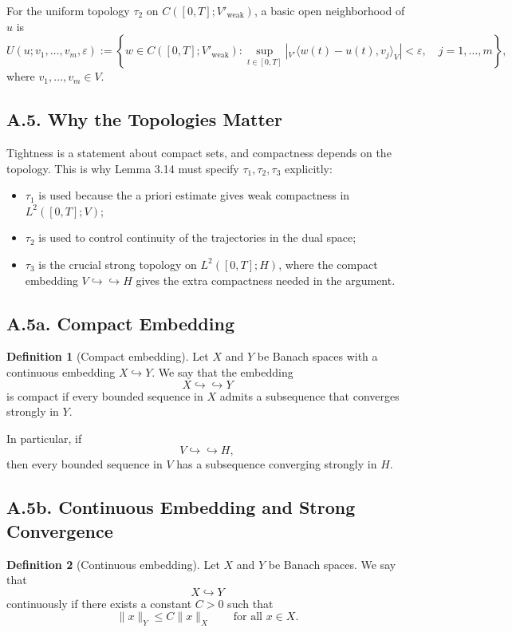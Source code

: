 \documentclass[11pt]{article}
\theoremstyle{definition}
\newtheorem{definition}{Definition}
\theoremstyle{remark}
\newcommand{\dual}[2]{{}_{V'}\langle #1, #2 \rangle_{V}}
\begin{document}
For the uniform topology $\tau_2$ on $C([0,T];V'_{\mathrm{weak}})$, a basic open neighborhood of $u$ is
\[
  U(u;v_1,\dots,v_m,\varepsilon)
  :=
  \left\{
    w\in C([0,T];V'_{\mathrm{weak}}):
    \sup_{t\in[0,T]}
    \left|
      \dual{w(t)-u(t)}{v_j}
    \right|<\varepsilon,\quad j=1,\dots,m
  \right\},
\]
where $v_1,\dots,v_m\in V$.

\subsection*{A.5. Why the Topologies Matter}
Tightness is a statement about compact sets, and compactness depends on the topology. This is why Lemma 3.14 must specify $\tau_1,\tau_2,\tau_3$ explicitly:
\begin{itemize}
\item $\tau_1$ is used because the a priori estimate gives weak compactness in $L^2([0,T];V)$;
\item $\tau_2$ is used to control continuity of the trajectories in the dual space;
\item $\tau_3$ is the crucial strong topology on $L^2([0,T];H)$, where the compact embedding $V\hookrightarrow\hookrightarrow H$ gives the extra compactness needed in the argument.
\end{itemize}

\subsection*{A.5a. Compact Embedding}
\begin{definition}[Compact embedding]
Let $X$ and $Y$ be Banach spaces with a continuous embedding $X\hookrightarrow Y$. We say that the embedding
\[
  X\hookrightarrow\hookrightarrow Y
\]
is compact if every bounded sequence in $X$ admits a subsequence that converges strongly in $Y$.
\end{definition}

In particular, if
\[
  V\hookrightarrow\hookrightarrow H,
\]
then every bounded sequence in $V$ has a subsequence converging strongly in $H$.

\subsection*{A.5b. Continuous Embedding and Strong Convergence}
\begin{definition}[Continuous embedding]
Let $X$ and $Y$ be Banach spaces. We say that
\[
  X\hookrightarrow Y
\]
continuously if there exists a constant $C>0$ such that
\[
  \|x\|_Y\le C\|x\|_X
  \qquad \text{for all } x\in X.
\]
\end{definition}
\end{document}
